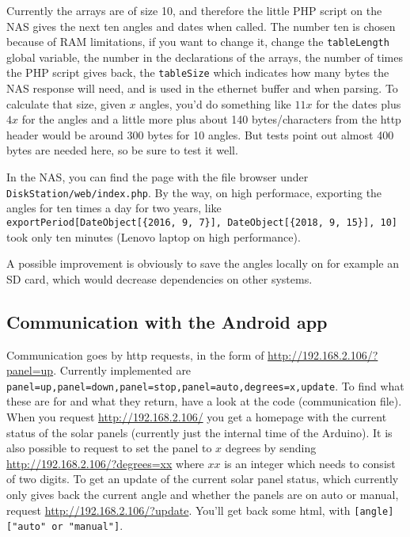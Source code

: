 \documentclass{article}
\begin{document}
			Currently the arrays are of size 10, and therefore the little PHP script on the NAS gives the next ten angles and dates when called. The number ten is chosen because of RAM limitations, if you want to change it, change the \verb|tableLength| global variable, the number in the declarations of the arrays, the number of times the PHP script gives back, the \verb|tableSize| which indicates how many bytes the NAS response will need, and is used in the ethernet buffer and when parsing. To calculate that size, given $x$ angles, you'd do something like $11x$ for the dates plus $4x$ for the angles and a little more plus about 140 bytes/characters from the http header would be around 300 bytes for 10 angles. But tests point out almost 400 bytes are needed here, so be sure to test it well. 
			
			In the NAS, you can find the page with the file browser under \verb|DiskStation/web/index.php|.
			By the way, on high performace, exporting the angles for ten times a day for two years, like \\ \verb|exportPeriod[DateObject[{2016, 9, 7}], DateObject[{2018, 9, 15}], 10]| took only ten minutes (Lenovo laptop on high performance).
			
			A possible improvement is obviously to save the angles locally on for example an SD card, which would decrease dependencies on other systems.
			
		\subsection{Communication with the Android app} \label{arduinoToAndroid}
			Communication goes by http requests, in the form of \url{http://192.168.2.106/?panel=up}. Currently implemented are \verb|panel=up,panel=down,panel=stop,panel=auto,degrees=x,update|. To find what these are for and what they return, have a look at the code (communication file). When you request \url{http://192.168.2.106/} you get a homepage with the current status of the solar panels (currently just the internal time of the Arduino). It is also possible to request to set the panel to $x$ degrees by sending \url{http://192.168.2.106/?degrees=xx} where $xx$ is an integer which needs to consist of two digits. To get an update of the current solar panel status, which currently only gives back the current angle and whether the panels are on auto or manual, request \url{http://192.168.2.106/?update}. You'll get back some html, with \verb|[angle] ["auto" or "manual"]|.
			
\end{document}

